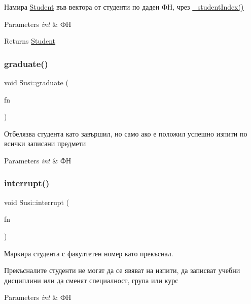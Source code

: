 Намира \hyperlink{class_student}{Student} във вектора от студенти по даден ФН, чрез \hyperlink{class_susi_a2c1e25d57c4cf29149803a4d86c8e585}{\+\_\+student\+Index()} 


\begin{DoxyParams}{Parameters}
{\em int} & ФН \\
\hline
\end{DoxyParams}
\begin{DoxyReturn}{Returns}
\hyperlink{class_student}{Student} 
\end{DoxyReturn}
\mbox{\label{class_susi_a59e196ecdbd15d01f846b442cdc9a345}} 
\subsubsection{\texorpdfstring{graduate()}{graduate()}}
{\footnotesize\ttfamily void Susi\+::graduate (\begin{DoxyParamCaption}\item[{int}]{fn }\end{DoxyParamCaption})}



Отбелязва студента като завършил, но само ако е положил успешно изпити по всички записани предмети 


\begin{DoxyParams}{Parameters}
{\em int} & ФН \\
\hline
\end{DoxyParams}
\mbox{\label{class_susi_af0dc551bdb5927df3cf961cf90768566}} 
\subsubsection{\texorpdfstring{interrupt()}{interrupt()}}
{\footnotesize\ttfamily void Susi\+::interrupt (\begin{DoxyParamCaption}\item[{int}]{fn }\end{DoxyParamCaption})}



Маркира студента с факултетен номер като прекъснал. 

Прекъсналите студенти не могат да се явяват на изпити, да записват учебни дисциплини или да сменят специалност, група или курс 
\begin{DoxyParams}{Parameters}
{\em int} & ФН \\
\hline
\end{DoxyParams}
\mbox{\label{class_susi_a130c33e1b520a6f06b876b5b547bb11b}} 
